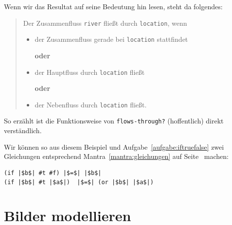 %
Wenn wir das Resultat auf seine Bedeutung hin lesen, steht da folgendes:
%
\begin{quote}
  Der Zusammenfluss \lstinline{river} fließt durch
  \lstinline{location}, wenn

  \begin{itemize}
  \item der Zusammenfluss gerade bei \lstinline{location} stattfindet

    \centerline{\textbf{oder}}
  \item der Hauptfluss durch \lstinline{location} fließt

    \centerline{\textbf{oder}}
  \item der Nebenfluss durch \lstinline{location} fließt.
  \end{itemize}
\end{quote}
%
So erzählt ist die Funktionsweise von \lstinline{flows-through?}
(hoffentlich) direkt verständlich.

Wir können so aus diesem Beispiel und
Aufgabe~\ref{aufgabe:iftruefalse} zwei Gleichungen entsprechend
Mantra~\ref{mantra:gleichungen} auf Seite~\pageref{mantra:gleichungen}
machen:
%
\begin{lstlisting}
(if |$b$| #t #f) |$=$| |$b$|
(if |$b$| #t |$a$|)  |$=$| (or |$b$| |$a$|)
\end{lstlisting}
%

\section{Bilder modellieren}


